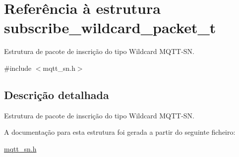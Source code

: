 \hypertarget{structsubscribe__wildcard__packet__t}{\section{Referência à estrutura subscribe\+\_\+wildcard\+\_\+packet\+\_\+t}
\label{structsubscribe__wildcard__packet__t}
}


Estrutura de pacote de inscrição do tipo Wildcard M\+Q\+T\+T-\/\+S\+N.  




{\ttfamily \#include $<$mqtt\+\_\+sn.\+h$>$}



\subsection{Descrição detalhada}
Estrutura de pacote de inscrição do tipo Wildcard M\+Q\+T\+T-\/\+S\+N. 

A documentação para esta estrutura foi gerada a partir do seguinte ficheiro\+:\begin{DoxyCompactItemize}
\item 
\hyperlink{mqtt__sn_8h}{mqtt\+\_\+sn.\+h}\end{DoxyCompactItemize}
